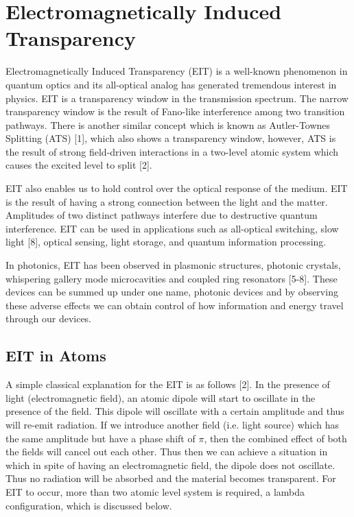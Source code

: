 \section{Electromagnetically Induced Transparency}
Electromagnetically Induced Transparency (EIT) is a well-known phenomenon in quantum optics and its all-optical analog has generated tremendous interest in physics. EIT is a transparency window in the transmission spectrum. The narrow transparency window is the result of Fano-like interference among two transition pathways. There is another similar concept which is known as Autler-Townes Splitting (ATS) [1], which also shows a transparency window, however, ATS is the result of strong field-driven interactions in a two-level atomic system which causes the excited level to split [2].

EIT also enables us to hold control over the optical response of the medium. EIT is the result of having a strong connection between the light and the matter. Amplitudes of two distinct pathways interfere due to destructive quantum interference. EIT can be used in applications such as all-optical switching, slow light [8], optical sensing, light storage, and quantum information processing.

In photonics, EIT has been observed in plasmonic structures, photonic crystals, whispering gallery mode microcavities and coupled ring resonators [5-8]. These devices can be summed up under one name, photonic devices and by observing these adverse effects we can obtain control of how information and energy travel through our devices.

\subsection{EIT in Atoms}
A simple classical explanation for the EIT is as follows [2]. In the presence of light (electromagnetic field), an atomic dipole will start to oscillate in the presence of the field. This dipole will oscillate with a certain amplitude and thus will re-emit radiation. If we introduce another field (i.e. light source) which has the same amplitude but have a phase shift of $\pi$, then the combined effect of both the fields will cancel out each other. Thus then we can achieve a situation in which in spite of having an electromagnetic field, the dipole does not oscillate. Thus no radiation will be absorbed and the material becomes transparent. For EIT to occur, more than two atomic level system is required, a lambda configuration, which is discussed below.

